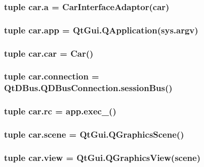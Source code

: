 \subsubsection[{a}]{\setlength{\rightskip}{0pt plus 5cm}tuple car.\+a = {\bf Car\+Interface\+Adaptor}({\bf car})}\label{namespacecar_ad7d6f676ff88010ad4be246489079649}
\hypertarget{namespacecar_ad1575dce72102f4a38ea6b1db9346b45}{}
\subsubsection[{app}]{\setlength{\rightskip}{0pt plus 5cm}tuple car.\+app = Qt\+Gui.\+Q\+Application(sys.\+argv)}\label{namespacecar_ad1575dce72102f4a38ea6b1db9346b45}
\hypertarget{namespacecar_a861dfca53f70d7bbb7f78412d282eaa3}{}
\subsubsection[{car}]{\setlength{\rightskip}{0pt plus 5cm}tuple car.\+car = {\bf Car}()}\label{namespacecar_a861dfca53f70d7bbb7f78412d282eaa3}
\hypertarget{namespacecar_a6dac8cb18ae2723dcdbd8a2f0a981ac5}{}
\subsubsection[{connection}]{\setlength{\rightskip}{0pt plus 5cm}tuple car.\+connection = Qt\+D\+Bus.\+Q\+D\+Bus\+Connection.\+session\+Bus()}\label{namespacecar_a6dac8cb18ae2723dcdbd8a2f0a981ac5}
\hypertarget{namespacecar_a6251bd0e65bcf66f4a0f679efe8d5f86}{}
\subsubsection[{rc}]{\setlength{\rightskip}{0pt plus 5cm}tuple car.\+rc = app.\+exec\+\_\+()}\label{namespacecar_a6251bd0e65bcf66f4a0f679efe8d5f86}
\hypertarget{namespacecar_af5c042696c68ad4d60a1862fce028f6f}{}
\subsubsection[{scene}]{\setlength{\rightskip}{0pt plus 5cm}tuple car.\+scene = Qt\+Gui.\+Q\+Graphics\+Scene()}\label{namespacecar_af5c042696c68ad4d60a1862fce028f6f}
\hypertarget{namespacecar_a5c086010f30a84ce6a0bc9f610e50411}{}
\subsubsection[{view}]{\setlength{\rightskip}{0pt plus 5cm}tuple car.\+view = Qt\+Gui.\+Q\+Graphics\+View({\bf scene})}\label{namespacecar_a5c086010f30a84ce6a0bc9f610e50411}
